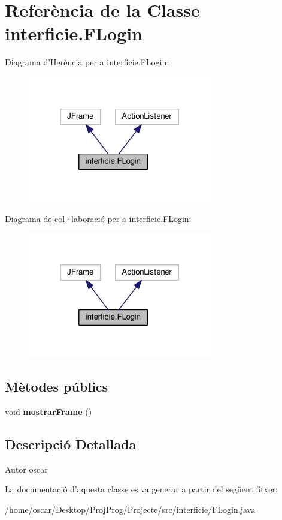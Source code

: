 \hypertarget{classinterficie_1_1_f_login}{\section{Referència de la Classe interficie.\+F\+Login}
\label{classinterficie_1_1_f_login}
}


Diagrama d'Herència per a interficie.\+F\+Login\+:\nopagebreak
\begin{figure}[H]
\begin{center}
\leavevmode
\includegraphics[width=228pt]{classinterficie_1_1_f_login__inherit__graph}
\end{center}
\end{figure}


Diagrama de col·laboració per a interficie.\+F\+Login\+:\nopagebreak
\begin{figure}[H]
\begin{center}
\leavevmode
\includegraphics[width=228pt]{classinterficie_1_1_f_login__coll__graph}
\end{center}
\end{figure}
\subsection*{Mètodes públics}
\begin{DoxyCompactItemize}
\item 
\hypertarget{classinterficie_1_1_f_login_a3e513170e07fbdf064de277557a3fc5d}{void {\bfseries mostrar\+Frame} ()}\label{classinterficie_1_1_f_login_a3e513170e07fbdf064de277557a3fc5d}

\end{DoxyCompactItemize}


\subsection{Descripció Detallada}
\begin{DoxyAuthor}{Autor}
oscar 
\end{DoxyAuthor}


La documentació d'aquesta classe es va generar a partir del següent fitxer\+:\begin{DoxyCompactItemize}
\item 
/home/oscar/\+Desktop/\+Proj\+Prog/\+Projecte/src/interficie/F\+Login.\+java\end{DoxyCompactItemize}
